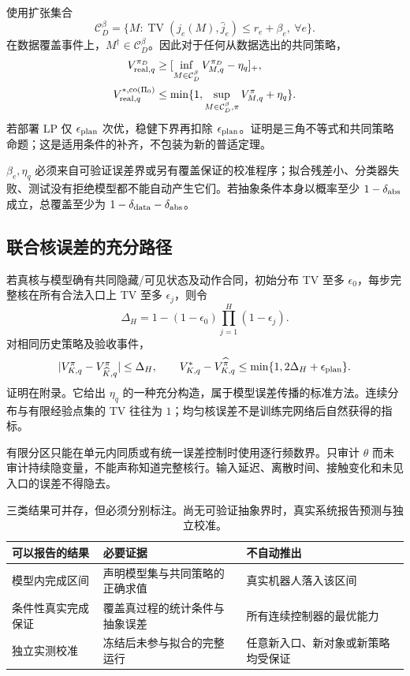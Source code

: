 \documentclass[11pt,a4paper,fontset=fandol]{ctexart}
\theoremstyle{definition}\newtheorem{definition}[theorem]{定义}
\theoremstyle{remark}\newtheorem{remark}[theorem]{说明}
\numberwithin{equation}{section}
\newcommand{\TV}{\operatorname{TV}}\newcommand{\osc}{\operatorname{osc}}
\newcommand{\pos}[1]{[#1]_+}\newcommand{\cD}{\mathcal D}
\newcommand{\cC}{\mathcal C}\newcommand{\cQ}{\mathcal Q}
\begin{document}
使用扩张集合
\begin{equation}
 \cC_D^\beta=\{M:\TV(j_e(M),\widehat j_e)\le r_e+\beta_e,\ \forall e\}.
 \label{eq:expanded}
\end{equation}
在数据覆盖事件上，$M^\dagger\in\cC_D^\beta$。因此对于任何从数据选出的共同策略，
\begin{align}
 V_{{\rm real},q}^{\pi_D}
 &\ge\pos{\inf_{M\in\cC_D^\beta}V_{M,q}^{\pi_D}-\eta_q},\\
 V_{{\rm real},q}^{*,\operatorname{co}(\Pi_0)}
 &\le\min\{1,\sup_{M\in\cC_D^\beta,\pi}V_{M,q}^{\pi}+\eta_q\}.
 \label{eq:real-cert}
\end{align}
若部署 LP 仅 $\epsilon_{\rm plan}$ 次优，稳健下界再扣除 $\epsilon_{\rm plan}$。证明是三角不等式和共同策略命题；这是适用条件的补齐，不包装为新的普适定理。

$\beta_e,\eta_q$ 必须来自可验证误差界或另有覆盖保证的校准程序；拟合残差小、分类器失败、测试没有拒绝模型都不能自动产生它们。若抽象条件本身以概率至少 $1-\delta_{\rm abs}$ 成立，总覆盖至少为 $1-\delta_{\rm data}-\delta_{\rm abs}$。

\subsection{联合核误差的充分路径}
若真核与模型确有共同隐藏/可见状态及动作合同，初始分布 TV 至多 $\epsilon_0$，每步完整核在所有合法入口上 TV 至多 $\epsilon_j$，则令
\begin{equation}
 \Delta_H=1-(1-\epsilon_0)\prod_{j=1}^{H}(1-\epsilon_j).
 \label{eq:coupling}
\end{equation}
对相同历史策略及验收事件，
\begin{equation}
 |V_{K,q}^{\pi}-V_{\widehat K,q}^{\pi}|\le\Delta_H,
 \qquad V_{K,q}^*-V_{K,q}^{\widehat\pi}
 \le\min\{1,2\Delta_H+\epsilon_{\rm plan}\}.
 \label{eq:propagation}
\end{equation}
证明在附录。它给出 $\eta_q$ 的一种充分构造，属于模型误差传播的标准方法\cite{partial,ais}。连续分布与有限经验点集的 TV 往往为 $1$；均匀核误差不是训练完网络后自然获得的指标。

有限分区只能在单元内同质或有统一误差控制时使用逐行频数界。只审计 $\theta$ 而未审计持续隐变量，不能声称知道完整核行。输入延迟、离散时间、接触变化和未见入口的误差不得隐去。

\begin{table}[htbp]\centering\small
\begin{tabularx}{\linewidth}{P{.23\linewidth}YY}\toprule
可以报告的结果 & 必要证据 & 不自动推出\\\midrule
模型内完成区间 & 声明模型集与共同策略的正确求值 & 真实机器人落入该区间\\
条件性真实完成保证 & 覆盖真过程的统计条件与抽象误差 & 所有连续控制器的最优能力\\
独立实测校准 & 冻结后未参与拟合的完整运行 & 任意新入口、新对象或新策略均受保证\\\bottomrule
\end{tabularx}
\caption{三类结果可并存，但必须分别标注。尚无可验证抽象界时，真实系统报告预测与独立校准。}
\end{table}
\end{document}
